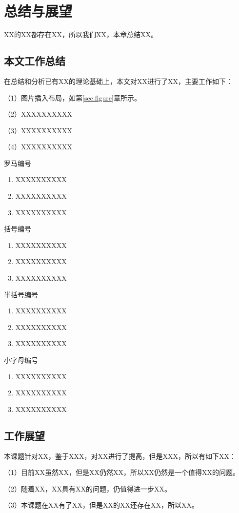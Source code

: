 \section{总结与展望}

XX的XX都存在XX，所以我们XX，本章总结XX。

\subsection{本文工作总结}
在总结和分析已有XX的理论基础上，本文对XX进行了XX，主要工作如下：

（1）图片插入布局，如第\ref{sec.figure}章所示。

（2）XXXXXXXXXX

（3）XXXXXXXXXX

（4）XXXXXXXXXX

罗马编号
\begin{enumerate}[label=(\roman*)]
 \item XXXXXXXXXX
 \item XXXXXXXXXX
 \item XXXXXXXXXX
\end{enumerate}
括号编号
\begin{enumerate}[label=(\arabic*)]
 \item XXXXXXXXXX
 \item XXXXXXXXXX
 \item XXXXXXXXXX
\end{enumerate}

半括号编号
\begin{enumerate}[label=\arabic*)]
 \item XXXXXXXXXX
 \item XXXXXXXXXX
 \item XXXXXXXXXX
\end{enumerate}

小字母编号
\begin{enumerate}[label=\alph*)]
 \item XXXXXXXXXX
 \item XXXXXXXXXX
 \item XXXXXXXXXX
\end{enumerate}
\subsection{工作展望}
本课题针对XX，鉴于XXX，对XX进行了提高，但是XXX，所以有如下XX：

（1）目前XX虽然XX，但是XX仍然XX，所以XX仍然是一个值得XX的问题。

（2）随着XX，XX具有XX的问题，仍值得进一步XX。

（3）本课题在XX有了XX，但是XX的XX还存在XX，所以XX。

